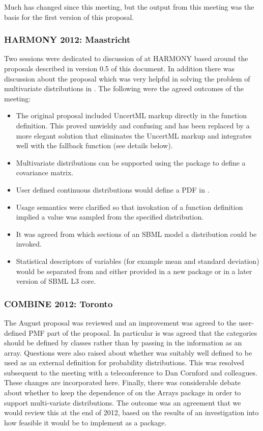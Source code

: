 \documentclass[draftspec]{sbmlpkgspec}
\begin{document}
Much has changed since this meeting, but the output from this meeting
was the basis for the first version of this proposal.


\subsubsection{HARMONY 2012: Maastricht}

Two sessions were dedicated to discussion of \distrib at HARMONY based
around the proposals described in version 0.5 of this document. In
addition there was discussion about the \arrays proposal which was
very helpful in solving the problem of multivariate distributions in
\distrib. The following were the agreed outcomes of the meeting:

\begin{itemize}
\item The original proposal included UncertML markup directly in the
  function definition. This proved unwieldy and confusing and has been
  replaced by a more elegant solution that eliminates the UncertML
  markup and integrates well with the fallback function (see details
  below).
\item Multivariate distributions can be supported using the \arrays
  package to define a covariance matrix.
\item User defined continuous distributions would define a PDF in
  \mathml.
\item Usage semantics were clarified so that invokation of a function
  definition implied a value was sampled from the specified
  distribution.
\item It was agreed from which sections of an SBML model a
  distribution could be invoked.
\item Statistical descriptors of variables (for
  example mean and standard deviation) would be separated from
  \distrib and either provided in a new package or in a later version
  of SBML L3 core.
\end{itemize}

\subsubsection{COMBINE 2012: Toronto}

The August proposal was reviewed and an improvement was agreed to
the user-defined PMF part of the proposal. In particular is was agreed
that the categories should be defined by \distribshort classes rather
than by passing in the information as an array. Questions were also raised
about whether \uncertml was suitably well defined to be used as an
external definition for probability distributions. This was resolved
subsequent to the meeting with a teleconference to Dan Cornford and
colleagues. These changes are incorporated here. Finally, there was
considerable debate about whether to keep the dependence of
\distribshort on the Arrays package in order to support multi-variate
distributions. The outcome was an agreement that we would review this
at the end of 2012, based on the results of an investigation
into how feasible it would be to implement \arrays as a package.
\end{document}
